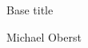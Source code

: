 \documentclass[11pt,a4paper]{article}
\begin{document}


\begin{center}
{\LARGE{Base title}}

\vspace{3mm}
{\Large Michael Oberst}
\vspace{3mm}
\end{center}







\end{document}
